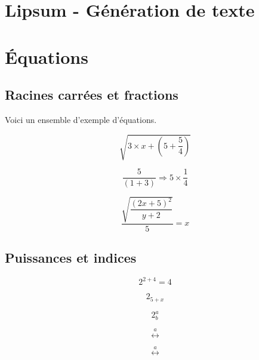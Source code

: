 \documentclass[a4paper]{article}
\begin{document}
\tableofcontents

\section{Lipsum - Génération de texte}

\lipsum[2] %

\section{\'Equations}

\subsection{Racines carrées et fractions}

Voici un ensemble d'exemple d'équations.

\begin{equation}
\sqrt{3\times x+\left(5+\frac{5}{4}\right)}
\end{equation}

\begin{equation}
\frac{5}{\left(1+3\right)} \Rightarrow 5\times\frac{1}{4}
\end{equation}

\begin{equation}
	\dfrac {\sqrt {\dfrac {\left( 2x+5\right) ^{2}}{y+2}}}{5}=x
\end{equation}

\subsection{Puissances et indices}

\begin{equation}
2^{2+4} = 4
\end{equation}

\begin{equation}
2_{5+x}
\end{equation}

\begin{equation}
2^{a}_{b}
\end{equation}

\begin{equation}
\stackrel{a}{\longleftrightarrow}
\end{equation}


\begin{equation}
\overset{a}{\longleftrightarrow}
\end{equation}
\end{document}
